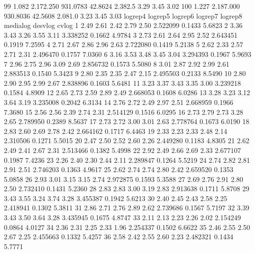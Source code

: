 \documentclass[12pt]{article}
\begin{document}
\begin{Schunk}
\begin{Soutput}
99    1.082  2.172.250   931.0783 42.8624  2.382.5    3.29    3.45    3.02
100   1.227  2.187.000   930.8036 42.5608  2.081.0    3.23    3.45    3.03
    logrep4 logrep5 logrep6 logrep7 logrep8 medialog desvlog  cvlog
1      2.49    2.61    2.42    2.79    2.50 2.522099  0.1433 5.6823
2      3.36    3.43    3.26    3.55    3.11 3.338252  0.1662 4.9784
3      2.73    2.61    2.64    2.95    2.52 2.643451  0.1919 7.2595
4      2.71    2.67    2.86    2.96    2.63 2.722080  0.1419 5.2138
5      2.62    2.33    2.57    2.71    2.31 2.496470  0.1757 7.0360
6      3.16    3.53    3.48    3.45    3.04 3.294393  0.1967 5.9693
7      2.96    2.75    2.96    3.09    2.69 2.856732  0.1573 5.5080
8      3.01    2.87    2.92    2.99    2.61 2.883513  0.1540 5.3423
9      2.80    2.35    2.35    2.47    2.15 2.495503  0.2133 8.5490
10     2.80    2.90    2.95    2.99    2.67 2.838896  0.1603 5.6481
11     3.23    3.37    3.43    3.35    3.00 3.239218  0.1584 4.8909
12     2.65    2.73    2.59    2.89    2.49 2.668053  0.1608 6.0286
13     3.28    3.23    3.12    3.64    3.19 3.235008  0.2042 6.3134
14     2.76    2.72    2.49    2.97    2.51 2.668959  0.1966 7.3680
15     2.56    2.56    2.39    2.74    2.31 2.514129  0.1516 6.0295
16     2.73    2.79    2.73    3.28    2.65 2.789950  0.2389 8.5637
17     2.73    2.72    3.00    3.01    2.63 2.778764  0.1673 6.0190
18     2.83    2.60    2.69    2.78    2.42 2.664162  0.1717 6.4463
19     2.33    2.23    2.33    2.48    2.14 2.310506  0.1271 5.5015
20     2.47    2.50    2.52    2.60    2.26 2.449280  0.1183 4.8305
21     2.62    2.49    2.41    2.67    2.31 2.513466  0.1382 5.4998
22     2.92    2.49    2.66    2.69    2.33 2.677107  0.1987 7.4236
23     2.26    2.40    2.30    2.44    2.11 2.289847  0.1264 5.5219
24     2.74    2.82    2.81    2.91    2.51 2.746203  0.1363 4.9617
25     2.62    2.74    2.74    2.80    2.42 2.659520  0.1353 5.0858
26     2.93    3.01    3.15    3.15    2.74 2.972875  0.1593 5.3588
27     2.69    2.76    2.91    2.80    2.50 2.732410  0.1431 5.2360
28     2.83    2.83    3.00    3.19    2.83 2.913638  0.1711 5.8708
29     3.43    3.55    3.24    3.74    3.28 3.455387  0.1942 5.6213
30     2.40    2.45    2.43    2.58    2.25 2.418941  0.1302 5.3811
31     2.86    2.71    2.76    2.89    2.62 2.739686  0.1567 5.7197
32     3.39    3.43    3.50    3.64    3.28 3.435945  0.1675 4.8747
33     2.11    2.13    2.23    2.26    2.02 2.154249  0.0864 4.0127
34     2.36    2.31    2.25    2.33    1.96 2.254337  0.1502 6.6622
35     2.46    2.55    2.50    2.67    2.25 2.455663  0.1332 5.4257
36     2.58    2.42    2.55    2.60    2.23 2.482321  0.1434 5.7771

\end{Soutput}
\end{Schunk}
\end{document}
